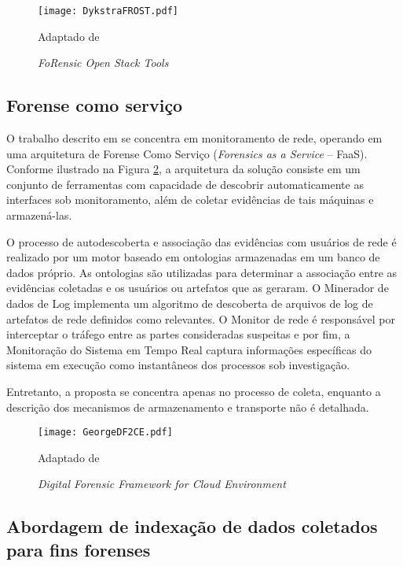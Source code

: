 \begin{figure}[htb!]
\footnotesize
\caption{\textit{FoRensic Open Stack Tools}}
\texttt{[image: DykstraFROST.pdf]}
\centering
\label{fig:DykstraFROST}
\begin{center}
Adaptado de \cite{DykstraFROST:2013} 
\end{center}
\end{figure}
%


\subsection{Forense como serviço}
\label{sec:frost}

O trabalho descrito em \cite{GeorgeDF2CE:2012} se concentra em monitoramento de rede, operando em uma arquitetura de Forense Como Serviço (\textit{Forensics as a Service} -- FaaS). 
%
Conforme ilustrado na Figura \ref{fig:GeorgeDF2CE}, a arquitetura da solução consiste em um conjunto de ferramentas com capacidade de descobrir automaticamente as interfaces sob monitoramento, além de coletar evidências de tais máquinas e armazená-las.


O processo de autodescoberta e associação das evidências com usuários de rede é realizado por um motor baseado em ontologias armazenadas em um banco de dados próprio. 
%
As ontologias são utilizadas para determinar a associação entre as evidências coletadas e os usuários ou artefatos que as geraram.
%
O Minerador de dados de Log implementa um algoritmo de descoberta de arquivos de log de artefatos de rede definidos como relevantes.
%
O Monitor de rede é responsável por interceptar o tráfego entre as partes consideradas suspeitas e por fim, a Monitoração do Sistema em Tempo Real captura informações específicas do sistema em execução como instantâneos dos processos sob investigação.


Entretanto, a proposta se concentra apenas no processo de coleta, enquanto a descrição dos mecanismos de armazenamento e transporte não é detalhada.


\begin{figure}[htb!]
\footnotesize
\caption{\textit{Digital Forensic Framework for Cloud Environment}}
\texttt{[image: GeorgeDF2CE.pdf]}
\centering
\label{fig:GeorgeDF2CE}
\begin{center}
Adaptado de \cite{GeorgeDF2CE:2012} 
\end{center}
\end{figure}


\subsection{Abordagem de indexação de dados coletados para fins forenses}
\label{sec:indexacaoforense}

